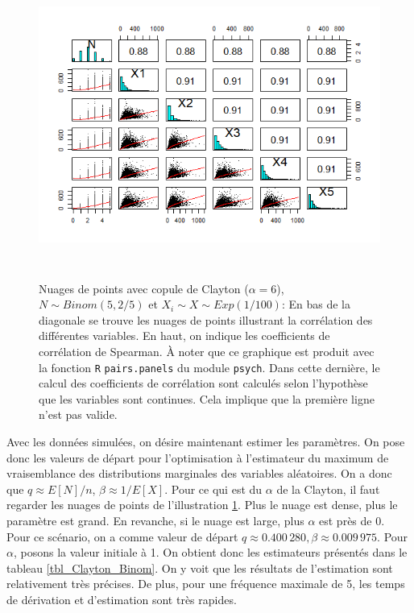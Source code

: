 \documentclass{article}
\begin{document}
		\begin{figure}[H]
			\centering
			\includegraphics[height=10cm]{Graph/scatterplot_Binom.png}
			\caption[Nuages de points du scénario \ref{scenario_Clayton_Binom}]
			{Nuages de points avec copule de Clayton ($\alpha = 6$), $N\sim Binom(5,2/5)$ et $X_i \sim X\sim Exp(1/100)$:
				En bas de la diagonale se trouve les nuages de points illustrant la corrélation des différentes variables. En haut, on indique les coefficients de corrélation de Spearman. À noter que ce graphique est produit avec la fonction \texttt{R} \texttt{pairs.panels} du module \texttt{psych}. Dans cette dernière, le calcul des coefficients de corrélation sont calculés selon l'hypothèse que les variables sont continues. Cela implique que la première ligne n'est pas valide.}
			\label{graph_scatterplot_Binom}
		\end{figure}
		
		Avec les données simulées, on désire maintenant estimer les paramètres. On pose donc les valeurs de départ pour l'optimisation à l'estimateur du maximum de vraisemblance des distributions marginales des variables aléatoires. On a donc que $q \approx E[N]/n$, $\beta \approx 1/E[X]$. Pour ce qui est du $\alpha$ de la Clayton, il faut regarder les nuages de points de  l'illustration \ref{graph_scatterplot_Binom}. Plus le nuage est dense, plus le paramètre est grand. En revanche, si le nuage est large, plus $\alpha$ est près de 0.\\
		
		Pour ce scénario, on a comme valeur de départ $q \approx 0.400\,280, \beta \approx 0.009\,975$. Pour $\alpha$, posons la valeur initiale à 1. On obtient donc les estimateurs  présentés dans le tableau \ref{tbl_Clayton_Binom}. On y voit que les résultats de l'estimation sont relativement très précises. De plus, pour une fréquence maximale de 5, les temps de dérivation et d'estimation sont très rapides.
		
\end{document}
